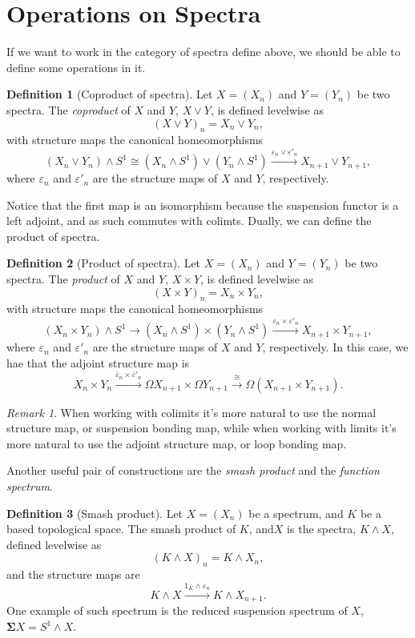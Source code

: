 \documentclass[a4paper,english,11pt]{article}
\theoremstyle{definition}
\newtheorem{Def}{Definition}
\theoremstyle{plain}
\theoremstyle{remark}
\newtheorem{rem}{\color{red}Remark}
\newcommand{\susp}{\mathbf{\Sigma}}
\newcommand{\struc}{\varepsilon}
\newcommand{\astruc}{\bar{\varepsilon}}
\begin{document}
\section{Operations on Spectra}
If we want to work in the category of spectra define above, we should be able to define some operations in it. 
\begin{Def}[Coproduct of spectra]
  Let \(X=(X_n)\) and \(Y=(Y_n)\) be two spectra. The \textit{coproduct} of \(X\) and \(Y\), \(X\vee Y\), is defined levelwise as
  \[(X\vee Y)_n=X_n\vee Y_n,\]
  with structure maps the canonical homeomorphisms
  \[(X_n\vee Y_n)\wedge S^1\cong (X_n\wedge S^1)\vee (Y_n\wedge S^1)\xrightarrow{\struc_n\vee \struc'_n} X_{n+1}\vee Y_{n+1},\]
  where \(\struc_n\) and \(\struc'_n\) are the structure maps of \(X\) and \(Y\), respectively.
\end{Def}
Notice that the first map is an isomorphism because the suspension functor is a left adjoint, and as such commutes with colimts. Dually, we can define the product of spectra.
\begin{Def}[Product of spectra]
  Let \(X=(X_n)\) and \(Y=(Y_n)\) be two spectra. The \textit{product} of \(X\) and \(Y\), \(X\times Y\), is defined levelwise as
  \[(X\times Y)_n=X_n\times Y_n,\]
  with structure maps the canonical homeomorphisms
  \[(X_n\times Y_n)\wedge S^1\longrightarrow (X_n\wedge S^1)\times (Y_n\wedge S^1)\xrightarrow{\struc_n\times \struc'_n} X_{n+1}\times Y_{n+1},\]
  where \(\struc_n\) and \(\struc'_n\) are the structure maps of \(X\) and \(Y\), respectively.
  In this case, we hae that the adjoint structure map is 
  \[X_n\times Y_n\xrightarrow{\astruc_n\times\astruc'_n}\Omega X_{n+1}\times\Omega Y_{n+1}\xrightarrow{\cong}\Omega(X_{n+1}\times Y_{n+1}).\]
\end{Def}
\begin{rem}
  When working with colimits it's more natural to use the normal structure map, or suspension bonding map, while when working with limits it's more natural to use the adjoint structure map, or loop bonding map.
\end{rem}
Another useful pair of constructions are the \textit{smash product} and the \textit{function spectrum}.
\begin{Def}[Smash product]
  Let \(X=(X_n)\) be a spectrum, and \(K\) be a based topological space. The smash product of \(K\), and\(X\) is the spectra, \(K\wedge X\), defined levelwise as 
  \[(K\wedge X)_n=K\wedge X_n,\]
  and the structure maps are
  \[K\wedge X\xrightarrow{1_K\wedge\struc_n}K\wedge X_{n+1}.\]
  One example of such spectrum is the reduced suspension spectrum of \(X\), \(\susp X=S^1\wedge X\).  
\end{Def}
\end{document}
